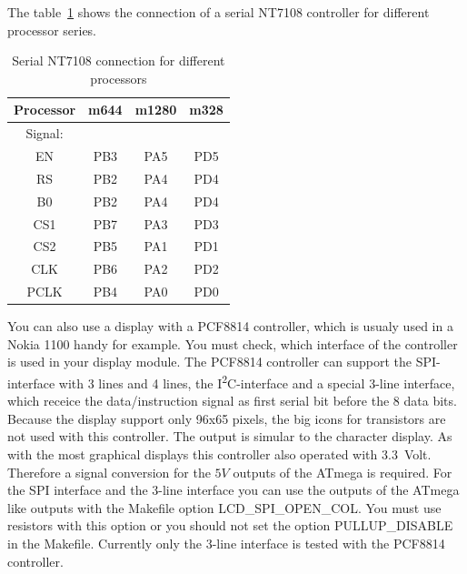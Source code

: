 The table~\ref{tab:7108-processor} shows the connection of a serial NT7108 controller
for different processor series.
\begin{table}[H]
  \begin{center}
    \begin{tabular}{| c || c | c | c |}
    \hline
 Processor  & m644  &  m1280  & m328 \\
    \hline
    \hline
Signal:     &       &        &         \\
  EN        &  PB3  &  PA5   & PD5     \\
    \hline
  RS        &  PB2  &  PA4   & PD4      \\
  B0        &  PB2  &  PA4   & PD4      \\
    \hline
  CS1       &  PB7  &  PA3   & PD3      \\
    \hline
  CS2       &  PB5  &  PA1   & PD1      \\
    \hline
  CLK       &  PB6  &  PA2   & PD2      \\
    \hline
  PCLK      &  PB4  &  PA0   & PD0      \\
    \hline
    \end{tabular}
  \end{center}
  \caption{Serial NT7108 connection for different processors}
  \label{tab:7108-processor}
\end{table}

You can also use a display with a PCF8814 controller, which is usualy used in a Nokia 1100 handy for example.
You must check, which interface of the controller is used in your display module.
The PCF8814 controller can support the SPI-interface with 3 lines and 4 lines,
the I\textsuperscript{2}C-interface and a special 3-line interface, which receice
the data/instruction signal as first serial bit before the 8 data bits.
Because the display support only 96x65 pixels, the big icons for transistors are not
used with this controller. The output is simular to the character display.
As with the most graphical displays this controller also operated with 3.3~Volt.
Therefore a signal conversion for the \(5V\) outputs of the ATmega is required.
For the SPI interface and the 3-line interface you can use the outputs of the ATmega
like  outputs with the Makefile option LCD\_SPI\_OPEN\_COL.
You must use  resistors with this option or you should not set
the option PULLUP\_DISABLE in the Makefile.
Currently only the 3-line interface is tested with the PCF8814 controller.

